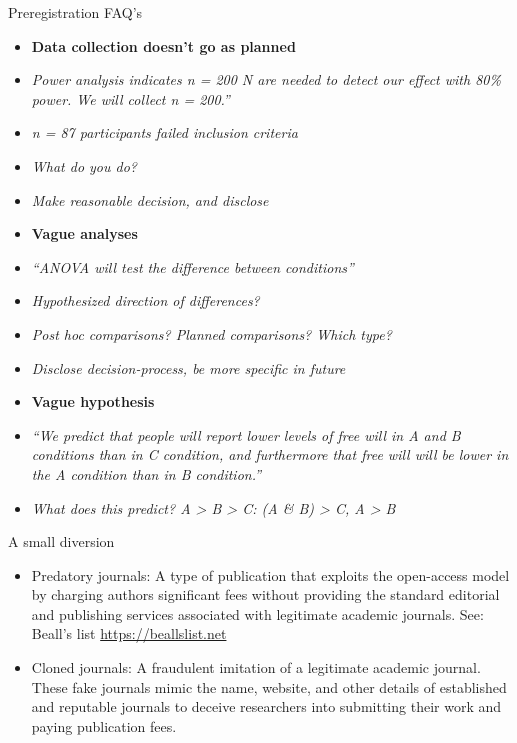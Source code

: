 \documentclass[
  ignorenonframetext,
  aspectratio=169,
]{beamer}
\providecommand{\tightlist}{%
  \setlength{\itemsep}{0pt}\setlength{\parskip}{0pt}}\usepackage{longtable,booktabs,array}
\begin{document}
\begin{frame}{Preregistration FAQ's}
\label{preregistration-faqs-1}
\begin{itemize}
\tightlist
\item
  \textbf{Data collection doesn't go as planned}
\item
  \emph{Power analysis indicates n = 200 N are needed to detect our
  effect with 80\% power. We will collect n = 200.''}
\item
  \emph{n = 87 participants failed inclusion criteria}
\item
  \emph{What do you do?}
\item
  \emph{Make reasonable decision, and disclose}
\item
  \textbf{Vague analyses}
\item
  \emph{``ANOVA will test the difference between conditions''}
\item
  \emph{Hypothesized direction of differences?}
\item
  \emph{Post hoc comparisons? Planned comparisons? Which type?}
\item
  \emph{Disclose decision-process, be more specific in future}
\item
  \textbf{Vague hypothesis}
\item
  \emph{``We predict that people will report lower levels of free will
  in A and B conditions than in C condition, and furthermore that free
  will will be lower in the A condition than in B condition.''}
\item
  \emph{What does this predict? A \textgreater{} B \textgreater{} C: (A
  \& B) \textgreater{} C, A \textgreater{} B}
\end{itemize}
\end{frame}

\begin{frame}{A small diversion}
\label{a-small-diversion}
\begin{itemize}[<+->]
\tightlist
\item
  Predatory journals: A type of publication that exploits the
  open-access model by charging authors significant fees without
  providing the standard editorial and publishing services associated
  with legitimate academic journals. See: Beall's list
  \url{https://beallslist.net}
\item
  Cloned journals: A fraudulent imitation of a legitimate academic
  journal. These fake journals mimic the name, website, and other
  details of established and reputable journals to deceive researchers
  into submitting their work and paying publication fees.
\end{itemize}
\end{frame}
\end{document}
